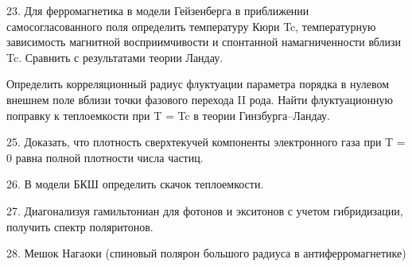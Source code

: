 \documentclass[a4paper,12pt]{article} %
\begin{document}
\begin{ttask}

23. Для ферромагнетика в модели Гейзенберга в приближении самосогласованного поля определить температуру Кюри Tc, температурную зависимость магнитной восприимчивости  и спонтанной намагниченности вблизи Tc. Сравнить с результатами теории Ландау.

\end{ttask}



\begin{ttask}

Определить корреляционный радиус флуктуации параметра порядка в нулевом внешнем поле вблизи точки фазового перехода II рода. Найти флуктуационную поправку к теплоемкости при T = Tc в теории Гинзбурга–Ландау.

\end{ttask}





\begin{ttask}

25. Доказать, что плотность сверхтекучей компоненты электронного газа при T = 0 равна полной плотности числа частиц.  

\end{ttask}


\begin{ttask}

26. В модели БКШ определить скачок теплоемкости.

\end{ttask}

\begin{ttask}

27. Диагонализуя гамильтониан для фотонов и экситонов с учетом гибридизации, получить спектр поляритонов. 


\end{ttask}



\begin{ttask}

28. Мешок Нагаоки (спиновый полярон большого радиуса в антиферромагнетике)






\end{ttask}
\end{document}
